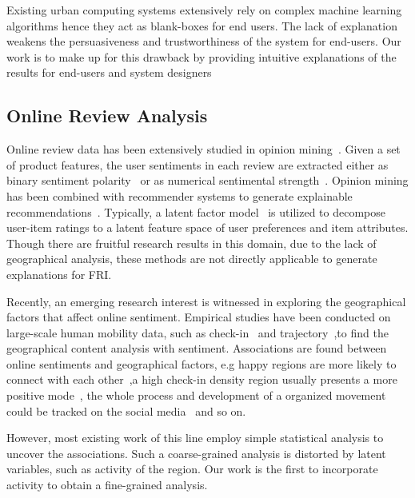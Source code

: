 \documentclass[runningheads]{llncs}
\begin{document}
Existing urban computing systems extensively rely on complex machine learning algorithms hence they act as blank-boxes for end users.
The lack of explanation weakens the persuasiveness and trustworthiness of the system for end-users.
Our work is to make up for this drawback by providing intuitive explanations of the results for end-users and system designers

\subsection{Online Review Analysis}
Online review data has been extensively studied in opinion mining~\cite{}. Given a set of product features, the user sentiments in each review are extracted either as binary sentiment polarity~\cite{} or as numerical sentimental strength~\cite{}. Opinion mining has been combined with recommender systems to generate explainable recommendations~\cite{}. Typically, a latent factor model~\cite{} is utilized to decompose user-item ratings to a latent feature space of user preferences and item attributes. Though there are fruitful research results in this domain, due to the lack of geographical analysis, these methods are not directly applicable to generate explanations for FRI.

Recently, an emerging research interest is witnessed in exploring the geographical factors that affect online sentiment.
Empirical studies have been conducted on large-scale human mobility data, such as check-in ~\cite{Gallegos16happier}and trajectory~\cite{Gonzlez2008Track},to find the geographical content analysis with sentiment.
Associations are found between online sentiments and geographical factors, e.g happy regions are more likely to connect with each other~\cite{Alshamsi15milan},a high check-in density region usually presents a more positive mode~\cite{Gallegos16happier}, the whole process and development of a organized movement could be tracked on the social media~\cite{Alvarez2015Movement} and so on.

However, most existing work of this line employ simple statistical analysis to uncover the associations.
Such a coarse-grained analysis is distorted by latent variables, such as activity of the region.
Our work is the first to incorporate activity to obtain a fine-grained analysis.
\end{document}

